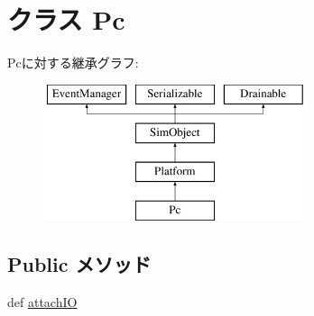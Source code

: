 \hypertarget{classPc_1_1Pc}{
\section{クラス Pc}
\label{classPc_1_1Pc}
}
Pcに対する継承グラフ:\begin{figure}[H]
\begin{center}
\leavevmode
\includegraphics[height=4cm]{classPc_1_1Pc}
\end{center}
\end{figure}
\subsection*{Public メソッド}
\begin{DoxyCompactItemize}
\item 
def \hyperlink{classPc_1_1Pc_ac750675f6d6de3ad52f8c5b03ee45a65}{attachIO}
\end{DoxyCompactItemize}
